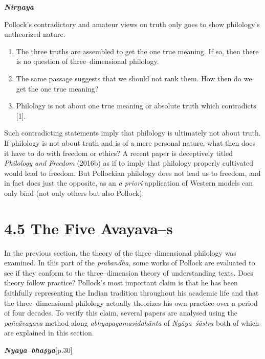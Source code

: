 \textit{\textbf{Nirṇaya}}

Pollock’s contradictory and amateur views on truth only goes to show philology’s untheorized nature.

\begin{enumerate}
\itemsep=0pt
\item The three truths are assembled to get the one true meaning. If so, then there is no question of three–dimensional philology.

 \item The same passage suggests that we should not rank them. How then do we get the one true meaning?

 \item Philology is not about one true meaning or absolute truth which contradicts [1].

\end{enumerate}

Such contradicting statements imply that philology is ultimately not about truth. If philology is not about truth and is of a mere personal nature, what then does it have to do with freedom or ethics? A recent paper is deceptively titled \textit{Philology and Freedom} (2016b) as if to imply that philology properly cultivated would lead to freedom. But Pollockian philology does not lead us to freedom, and in fact does just the opposite, as an \textit{a priori} application of Western models can only bind (not only others but also Pollock).

\vspace{-.3cm}

\section*{4.5 The Five Avayava–s}

In the previous section, the theory of the three–dimensional philology was examined. In this part of the \textit{prabandha}, some works of Pollock are evaluated to see if they conform to the three–dimension theory of understanding texts. Does theory follow practice? Pollock’s most important claim is that he has been faithfully representing the Indian tradition throughout his academic life and that the three–dimensional philology actually theorizes his own practice over a period of four decades. To verify this claim, several papers are analysed using the \textit{pañcāvayava} method along \textit{abhyupagamasiddhānta} of \textit{Nyāya–śāstra} both of which are explained in this section.

\textit{\textbf{Nyāya–bhāṣya}}[p.30]

